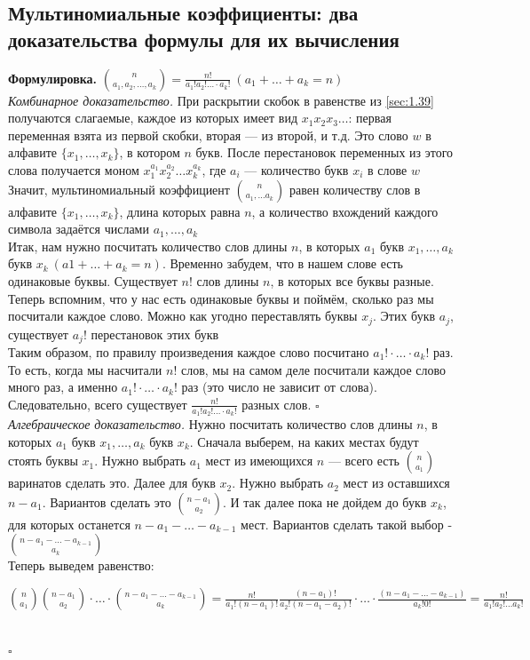 \documentclass[a4paper]{article}
\newcommand{\qed}{\hfill$\square$}
\begin{document}
\subsection{Мультиномиальные коэффициенты: два доказательства формулы для их вычисления}
\textbf{Формулировка.} $\binom{n}{a_1,a_2,\ldots,a_k}=\frac{n!}{a_1!a_2!\ldots\cdot a_k!}\ (a_1+\ldots+a_k=n)$\\[2mm]
\textit{Комбинарное доказательство.} При раскрытии скобок в равенстве из \ref{sec:1.39} получаются слагаемые, каждое из которых имеет вид $x_1x_2x_3\ldots$: первая переменная взята из первой скобки, вторая — из второй, и т.д. Это слово $w$ в алфавите $\{x_1,\ldots, x_k\}$, в котором $n$ букв. После перестановок переменных из этого слова получается моном $x_1^{a_1}x_2^{a_2}\ldots x_k^{a_k}$, где $a_i$ — количество букв $x_i$ в слове $w$\\[2mm]
\indent Значит, мультиномиальный коэффициент $\binom{n}{a_1,\ldots a_k}$ равен количеству слов в алфавите $\{x_1,\ldots, x_k\}$, длина которых равна $n$, а количество вхождений каждого символа задаётся числами $a_1,\ldots,a_k$\\[2mm]
\indent Итак, нам нужно посчитать количество слов длины $n$, в которых $a_1$ букв $x_1,\ldots,a_k$ букв $x_k\ (a1+\ldots+a_k=n)$. Временно забудем, что в нашем слове есть одинаковые буквы. Существует $n!$ слов длины $n$, в которых все буквы разные.\\[2mm]
\indent Теперь вспомним, что у нас есть одинаковые буквы и поймём, сколько раз мы посчитали каждое слово. Можно как угодно переставлять буквы $x_j$. Этих букв $a_j$, существует $a_j!$ перестановок этих букв\\[2mm]
\indent Таким образом, по правилу произведения каждое слово посчитано $a_1!\cdot\ldots\cdot a_k!$ раз. То есть, когда мы насчитали $n!$ слов, мы на самом деле посчитали каждое слово много раз, а именно $a_1!\cdot\ldots\cdot a_k!$ раз (это число не зависит от слова). Следовательно,
всего существует $\frac{n!}{a_1!a_2!\ldots\cdot a_k!}$ разных слов. \qed\\[2mm]
\textit{Алгебраическое доказательство.} Нужно посчитать количество слов
длины $n$, в которых $a_1$ букв $x_1,\ldots,a_k$ букв $x_k$. Сначала выберем, на каких местах будут стоять буквы $x_1$. Нужно выбрать $a_1$ мест из имеющихся $n$ — всего есть $\binom{n}{a_1}$ варинатов сделать это. Далее для букв $x_2$. Нужно выбрать $a_2$ мест из оставшихся $n-a_1$. Вариантов сделать это $\binom{n-a_1}{a_2}$. И так далее пока не дойдем до букв $x_k$, для которых останется $n-a_1-\ldots-a_{k-1}$ мест. Вариантов сделать такой выбор - $\binom{n-a_1-\ldots-a_{k-1}}{a_k}$\\[2mm]
Теперь выведем равенство:\\[2mm]
\centerline{$\binom{n}{a_1}\binom{n-a_1}{a_2}\cdot\ldots\cdot\binom{n-a_1-\ldots-a_{k-1}}{a_k}=\frac{n!}{a_1!(n-a_1)!}\frac{(n-a_1)!}{a_2!(n-a_1-a_2)!}\cdot\ldots\cdot\frac{(n-a_1-\ldots-a_{k-1})}{a_k!0!}=\frac{n!}{a_1!a_2!\ldots a_k!}$}\\[2mm]
\qed
\end{document}
